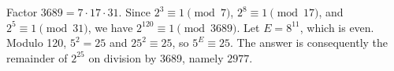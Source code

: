Factor $3689=7\cdot17\cdot31$. Since $2^3\equiv1\pmod7$, $2^8\equiv1\pmod{17}$, and $2^5\equiv1\pmod{31}$, we have $2^{120}\equiv1\pmod{3689}$. Let $E=8^{11}$, which is even. Modulo 120, $5^2=25$ and $25^2\equiv25$, so $5^E\equiv25$. The answer is consequently the remainder of $2^{25}$ on division by 3689, namely $\boxed{2977}$.
